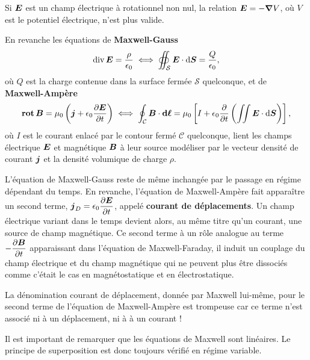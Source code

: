 \begin{attention}
	Si $\vece$ est un champ électrique à rotationnel non nul, la relation 
	$\vece = - \grad V$, où $V$ est le potentiel électrique, n'est plus valide.
\end{attention}

\begin{defn}
	En revanche les équations de \textbf{Maxwell-Gauss}
	\begin{equation}
		\div \vece = \dfrac{\rho}{\epsilon_0} \iff \oiint_\mathcal{S}
		\vece \cdot \ds = \dfrac{Q}{\epsilon_0}, 
	\end{equation}
	où $Q$ est la charge contenue dans la surface fermée $\mathcal{S}$ quelconque, 
	et de \textbf{Maxwell-Ampère} 
	\begin{equation}
		\rot \vecb = \mu_0\left(\vecj + \epsilon_0 \dd{\vece}{t}\right)
		\iff \oint_\mathcal{C} \vecb \cdot \dl = \mu_0 \left[
		I + \epsilon_0 \dfrac{\partial}{\partial t} 
		\left(\iint \vece \cdot \ds\right)
	\right],
	\end{equation}
	où $I$ est le courant enlacé par le contour fermé $\mathcal{C}$ quelconque, 
	lient les champs électrique $\vece$ et magnétique $\vecb$ à leur source 
	modéliser par le vecteur densité
	de courant $\vecj$ et la densité volumique de charge $\rho$. 
\end{defn}

L'équation de Maxwell-Gauss reste de même inchangée par le passage en régime
dépendant du temps. En revanche, l'équation de Maxwell-Ampère fait apparaître un
second terme, $\vecj_D = \epsilon_0 \dd{\vece}{t}$, appelé \textbf{courant de
déplacements}. Un champ électrique variant dans le temps devient alors, au même
titre qu'un courant, une source de champ magnétique. Ce second terme à un rôle
analogue au terme $- \dd{\vecb}{t}$ apparaissant dans l'équation de 
Maxwell-Faraday, il induit un couplage du champ électrique et du champ magnétique
qui ne peuvent plus être dissociés comme c'était le cas en magnétostatique
et en électrostatique.

\begin{attention}
	La dénomination courant de déplacement,
	donnée par Maxwell lui-même, 
	pour le second terme de l'équation de Maxwell-Ampère est trompeuse
	car ce terme n'est associé ni à un déplacement, ni à à un courant !
\end{attention}

Il est important de remarquer que les équations de Maxwell sont linéaires.
Le principe de superposition est donc toujours vérifié en régime variable. 

